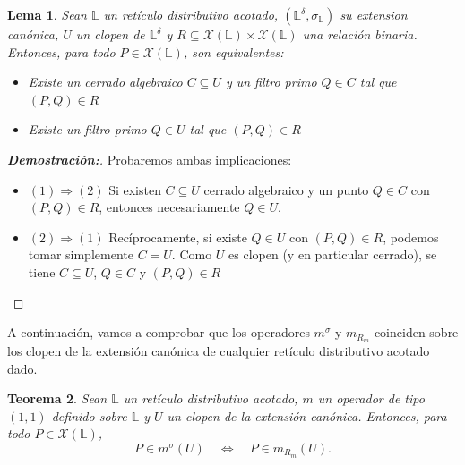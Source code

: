\documentclass[12pt]{book}
\newtheorem{theorem}{Teorema}[section]
\newtheorem{lemma}[theorem]{Lema}
\begin{document}
\begin{lemma}\label{lem:cerrado-vs-punto}
Sean $\mathbb{L}$ un retículo distributivo acotado, $(\mathbb{L}^{\delta},\sigma_{\mathbb{L}})$ su extension canónica, $U$ un clopen de $\mathbb{L}^{\delta}$ y $R\subseteq\mathcal X(\mathbb L)\times\mathcal X(\mathbb L)$ una relación binaria. Entonces, para todo $P\in\mathcal X(\mathbb L)$, son equivalentes:
\begin{itemize}
\item[1] Existe un cerrado algebraico $C \subseteq U$ y un filtro primo $Q \in C$ tal que $(P,Q) \in R$
\item[2] Existe un filtro primo $Q \in U$ tal que $(P,Q) \in R$
\end{itemize}
\end{lemma}

\begin{proof}[\textbf{Demostración:}]
Probaremos ambas implicaciones:
\begin{itemize}
\item  $ (1) \Rightarrow (2)$ Si existen $C\subseteq U$ cerrado algebraico y un punto $Q\in C$ con $(P,Q)\in R$,
entonces necesariamente $Q\in U$.

\item $(2)\Rightarrow (1)$ Recíprocamente, si existe $Q\in U$ con $(P,Q)\in R$,  
podemos tomar simplemente $C=U$.  
Como $U$ es clopen (y en particular cerrado),
se tiene $C\subseteq U$, $Q\in C$ y $(P,Q)\in R$
\end{itemize}
\end{proof}

A continuación, vamos a comprobar que los operadores \(m^\sigma\) y \(m_{R_m}\) coinciden sobre los clopen de la extensión canónica de cualquier retículo distributivo acotado dado.


\begin{theorem}\label{teo:igualdad-operadores}
Sean $\mathbb{L}$ un retículo distributivo acotado, $m$ un operador de tipo $(1,1)$ definido sobre $\mathbb{L}$ y $U$ un clopen de la extensión canónica. Entonces, para todo
$P\in\mathcal X(\mathbb L)$,
\[
P\in m^\sigma(U)
\quad\Longleftrightarrow\quad
P\in m_{R_m}(U).
\]
\end{theorem}
\end{document}
